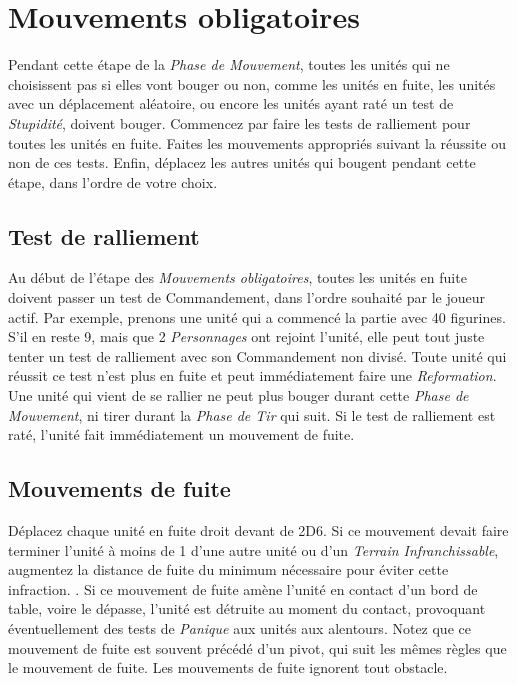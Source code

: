 \section{Mouvements obligatoires}

Pendant cette étape de la \emph{Phase de Mouvement}, toutes les unités qui ne choisissent pas si elles vont bouger ou non, comme les unités en fuite, les unités avec un déplacement aléatoire, ou encore les unités ayant raté un test de \emph{Stupidité}, doivent bouger. Commencez par faire les tests de ralliement pour toutes les unités en fuite. Faites les mouvements appropriés suivant la réussite ou non de ces tests. Enfin, déplacez les autres unités qui bougent pendant cette étape, dans l'ordre de votre choix.

\subsection{Test de ralliement}

Au début de l'étape des \emph{Mouvements obligatoires}, toutes les unités en fuite doivent passer un test de Commandement, dans l'ordre souhaité par le joueur actif.  Par exemple, prenons une unité qui a commencé la partie avec 40 figurines. S'il en reste 9, mais que 2 \emph{Personnages} ont rejoint l'unité, elle peut tout juste tenter un test de ralliement avec son Commandement non divisé. Toute unité qui réussit ce test n'est plus en fuite et peut immédiatement faire une \emph{Reformation}. Une unité qui vient de se rallier ne peut plus bouger durant cette \emph{Phase de Mouvement}, ni tirer durant la \emph{Phase de Tir} qui suit. Si le test de ralliement est raté, l'unité fait immédiatement un mouvement de fuite.

\subsection{Mouvements de fuite}

Déplacez chaque unité en fuite droit devant de 2D6{\pouce}. Si ce mouvement devait faire terminer l'unité à moins de 1{\pouce} d'une autre unité ou d'un \emph{Terrain Infranchissable}, augmentez la distance de fuite du minimum nécessaire pour éviter cette infraction. . Si ce mouvement de fuite amène l'unité en contact d'un bord de table, voire le dépasse, l'unité est détruite au moment du contact, provoquant éventuellement des tests de \emph{Panique} aux unités aux alentours. Notez que ce mouvement de fuite est souvent précédé d'un pivot, qui suit les mêmes règles que le mouvement de fuite. Les mouvements de fuite ignorent tout obstacle.

